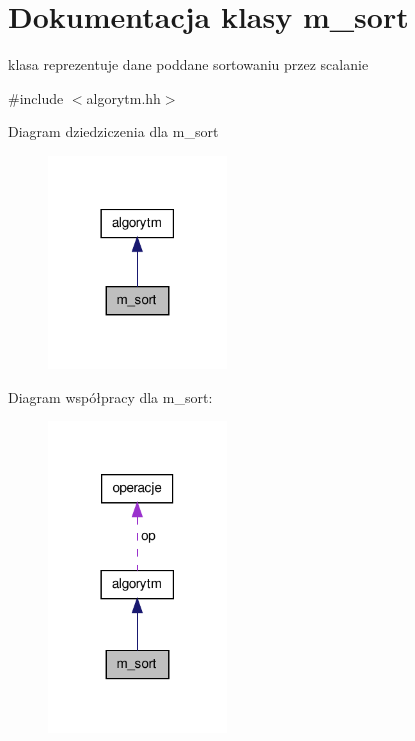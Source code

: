 \hypertarget{classm__sort}{\section{\-Dokumentacja klasy m\-\_\-sort}
\label{classm__sort}
}


klasa reprezentuje dane poddane sortowaniu przez scalanie  




{\ttfamily \#include $<$algorytm.\-hh$>$}



\-Diagram dziedziczenia dla m\-\_\-sort
\nopagebreak
\begin{figure}[H]
\begin{center}
\leavevmode
\includegraphics[width=134pt]{classm__sort__inherit__graph}
\end{center}
\end{figure}


\-Diagram współpracy dla m\-\_\-sort\-:
\nopagebreak
\begin{figure}[H]
\begin{center}
\leavevmode
\includegraphics[width=134pt]{classm__sort__coll__graph}
\end{center}
\end{figure}
